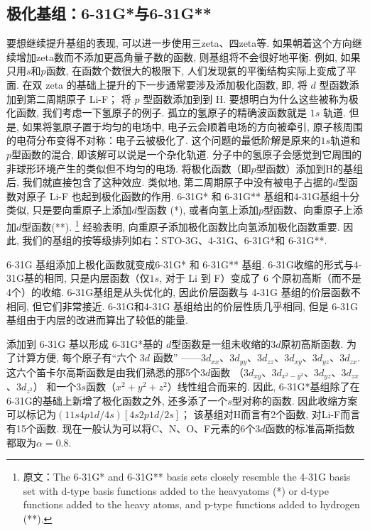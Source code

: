 \subsection{极化基组：6-31G*与6-31G**}
要想继续提升基组的表现, 
可以进一步使用三zeta、四zeta等. 
如果朝着这个方向继续增加zeta数而不添加更高角量子数的函数, 
则基组将不会很好地平衡. 
例如, 如果只用$s$和$p$函数, 
在函数个数很大的极限下, 
人们发现氨的平衡结构实际上变成了平面. 
在双 zeta 的基础上提升的下一步通常要涉及添加极化函数, 
即, 将 $d$ 型函数添加到第二周期原子 Li-F；
将 $p$ 型函数添加到到 H. 
要想明白为什么这些被称为极化函数, 
我们考虑一下氢原子的例子. 
孤立的氢原子的精确波函数就是 $1s$ 轨道. 
但是, 如果将氢原子置于均匀的电场中, 
电子云会顺着电场的方向被牵引, 
原子核周围的电荷分布变得不对称：电子云被极化了. 
这个问题的最低阶解是原来的$1s$轨道和$p$型函数的混合, 
即该解可以说是一个杂化轨道. 
分子中的氢原子会感觉到它周围的非球形环境产生的类似但不均匀的电场. 
将极化函数（即$p$型函数）添加到H的基组后, 
我们就直接包含了这种效应. 
类似地, 
第二周期原子中没有被电子占据的$d$型函数对原子 Li-F 也起到极化函数的作用. 
6-31G* 和 6-31G** 基组和4-31G基组十分类似, 
只是要向重原子上添加$d$型函数
(*), 或者向氢上添加$p$型函数、向重原子上添加$d$型函数(**).
\footnote{
原文：The 6-31G* and 6-31G** basis sets closely resemble the 4-31G basis set 
with d-type basis functions added to the heavyatoms (*) 
or d-type functions added to the heavy atoms, 
and p-type functions added to hydrogen (**).} 
经验表明, 向重原子添加极化函数比向氢添加极化函数重要. 
因此, 我们的基组的按等级排列如右：STO-3G、4-31G、6-31G*和 6-31G**. 

6-31G 基组添加上极化函数就变成6-31G* 和 6-31G** 基组.  
6-31G收缩的形式与4-31G基的相同, 
只是内层函数（仅$1s$, 对于 Li 到 F）变成了 6 个原初高斯（而不是4个）的收缩.  
6-31G基组是从头优化的, 
因此价层函数与 4-31G 基组的价层函数不相同, 但它们非常接近.  
6-31G和4-31G 基组给出的价层性质几乎相同, 
但是 6-31G 基组由于内层的改进而算出了较低的能量. 

添加到 6-31G 基以形成 6-31G*基的 $d$型函数是一组未收缩的$3d$原初高斯函数.  
为了计算方便, 每个原子有“六个 $3d$ 函数”
——$3d_{xx}$、$3d_{yy}$、$3d_{zz}$、$3d_{xy}$、$3d_{yz}$、$3d_{zx}$. 
这六个笛卡尔高斯函数是由我们熟悉的那5个$3d$函数
（$3d_{xy}$、$3d_{x^2-y^2}$、$3d_{yz}$、$3d_{zx}$、$3d_{z^2}$）
和一个$3s$函数（$x^2+y^2+z^2$）线性组合而来的. 
因此, 6-31G*基组除了在6-31G的基础上新增了极化函数之外, 
还多添了一个$s$型对称的函数. 
因此收缩方案可以标记为$(11s4p1d/4s)[4s2p1d/2s]$；
该基组对H而言有2个函数, 对Li-F而言有15个函数. 
现在一般认为可以将C、N、O、F元素的6个$3d$函数的标准高斯指数都取为$\alpha=0.8$. 

